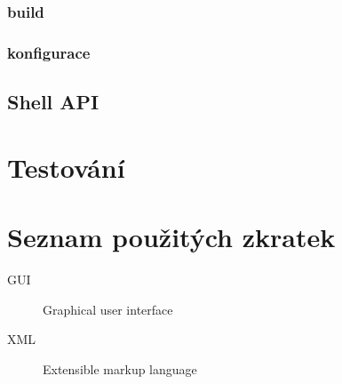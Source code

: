 \documentclass[thesis=B,czech]{FITthesis}[2012/06/26]
\begin{document}
\subsection*{build}
\subsection*{konfigurace}

\section{Shell API}

\chapter{Testování}

\begin{conclusion}

\end{conclusion}




\appendix

\chapter{Seznam použitých zkratek}
\begin{description}
	\item[GUI] Graphical user interface
	\item[XML] Extensible markup language
\end{description}
\end{document}
